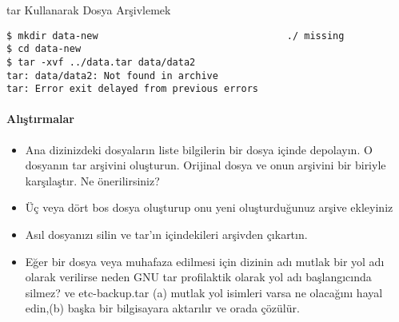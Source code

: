 \begin{section}{tar Kullanarak Dosya Arşivlemek}
\begin{verbatim}
$ mkdir data-new                                 ./ missing
$ cd data-new
$ tar -xvf ../data.tar data/data2
tar: data/data2: Not found in archive
tar: Error exit delayed from previous errors
\end{verbatim}
\paragraph{Alıştırmalar}{
\begin{itemize}
 \item Ana dizinizdeki dosyaların liste bilgilerin bir dosya içinde depolayın.
O dosyanın tar arşivini oluşturun. Orijinal dosya ve onun arşivini bir biriyle karşılaştır. Ne önerilirsiniz?
 \item Üç veya dört bos dosya oluşturup onu yeni oluşturduğunuz arşive ekleyiniz
 \item Asıl dosyanızı silin ve tar'ın içindekileri arşivden çıkartın.
 \item Eğer bir dosya veya muhafaza edilmesi için dizinin adı mutlak bir yol adı olarak verilirse neden GNU tar profilaktik olarak yol adı başlangıcında silmez? ve etc-backup.tar (a) mutlak yol isimleri varsa ne olacağını hayal edin,(b) başka bir bilgisayara aktarılır ve orada çözülür.
\end{itemize}}
\end{section}
